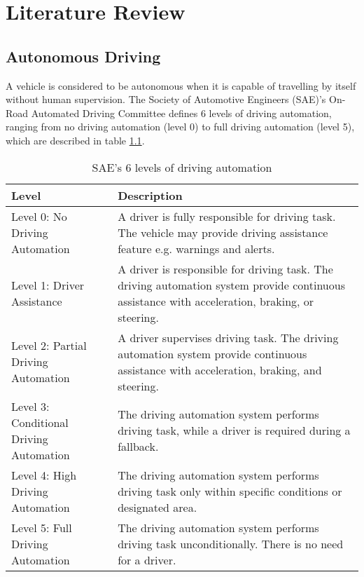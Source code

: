 \chapter{Literature Review}

\section{Autonomous Driving}

A vehicle is considered to be autonomous when it is capable of travelling by itself without human supervision. \cite{Springer_AutonomousDriving}  The Society of Automotive Engineers (SAE)'s On-Road Automated Driving Committee defines 6 levels of driving automation, ranging from no driving automation (level 0) to full driving automation (level 5)\cite{SAE_AutomationLevels}, which are described in table \ref{tab:sae-driving-automation}.



\begin{table}[h]
\begin{tabularx}{\textwidth}{p{4cm}|X}
\textbf{Level} & \textbf{Description} \\
\hline
\raggedright{Level 0: No Driving Automation} & 
A driver is fully responsible for driving task. The vehicle may provide driving assistance feature e.g. warnings and alerts.\\ 
\hline
\raggedright{Level 1: Driver Assistance} &
A driver is responsible for driving task. The driving automation system provide continuous assistance with acceleration, braking, or steering.\\
\hline
\raggedright{Level 2: Partial Driving Automation} &
A driver supervises driving task. The driving automation system provide continuous assistance with acceleration, braking, and steering.\\
\hline
\raggedright{Level 3: Conditional Driving Automation} &
The driving automation system performs driving task, while a driver is required during a fallback.\\
\hline
\raggedright{Level 4: High Driving Automation} &
The driving automation system performs driving task only within specific conditions or designated area.\\
\hline
\raggedright{Level 5: Full Driving Automation} &
The driving automation system performs driving task unconditionally. There is no need for a driver.

\end{tabularx}
\caption{SAE's 6 levels of driving automation}
\label{tab:sae-driving-automation}
\end{table}


